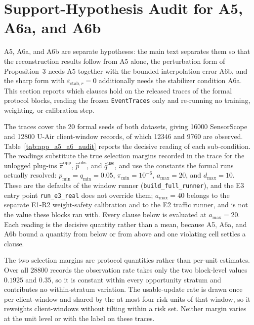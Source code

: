 \section{Support-Hypothesis Audit for A5, A6a, and A6b}
\label{app:a5_a6_audit}

A5, A6a, and A6b are separate hypotheses: the main text separates them so that
the reconstruction results follow from A5 alone, the perturbation form of
Proposition~3 needs A5 together with the bounded interpolation error A6b, and
the sharp form with $\varepsilon_{\mathrm{stab},r}=0$ additionally needs the
stabilizer condition A6a.  This section reports which clauses hold on the
released traces of the formal protocol blocks, reading the frozen
\texttt{EventTraces} only and re-running no training, weighting, or
calibration step.

The traces cover the 20 formal seeds of both datasets, giving 16000
SensorScope and 12800 U-Air client-window records, of which 12346 and 9760
are observed.  Table~\ref{tab:app_a5_a6_audit} reports the decisive reading of
each sub-condition.  The readings substitute the true selection margins
recorded in the trace for the unlogged plug-ins
$\widehat\pi^{\mathrm{opp}}$, $\widehat p^{\mathrm{obs}}$, and
$\widehat q^{\mathrm{use}}$, and use the constants the formal runs actually
resolved: $p_{\min}=q_{\min}=0.05$, $\pi_{\min}=10^{-6}$, $a_{\max}=20$, and
$d_{\max}=10$.  These are the defaults of the window runner
(\texttt{build\_full\_runner}), and the E3 entry point \texttt{run\_e3\_real}
does not override them; $a_{\max}=40$ belongs to the separate E1-R2
weight-safety calibration and to the E2 traffic runner, and is not the value
these blocks ran with.  Every clause below is evaluated at $a_{\max}=20$.
Each reading is
the decisive quantity rather than a mean, because A5, A6a, and A6b bound a
quantity from below or from above and one violating cell settles a clause.

The two selection margins are protocol quantities rather than per-unit
estimates.  Over all $28800$ records the observation rate takes only the two
block-level values $0.1925$ and $0.35$, so it is constant within every
opportunity stratum and contributes no within-stratum variation.  The
usable-update rate is drawn once per client-window and shared by the at most
four risk units of that window, so it reweights client-windows without tilting
within a risk set.  Neither margin varies at the unit level or with the label
on these traces.

